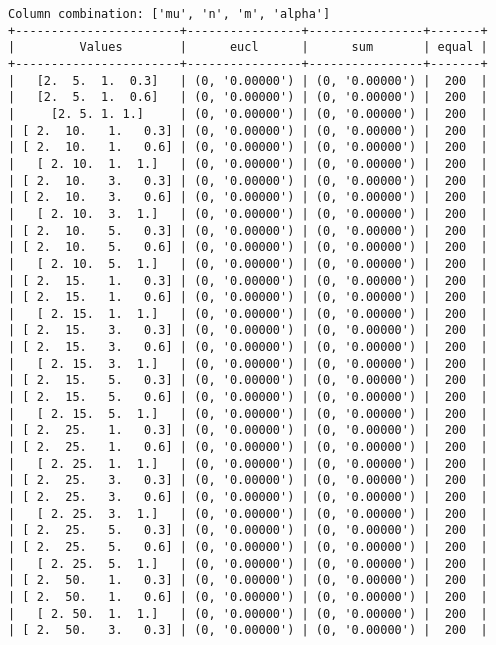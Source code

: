 \documentclass{article}
\begin{document}
\begin{verbatim}
Column combination: ['mu', 'n', 'm', 'alpha']
+-----------------------+----------------+----------------+-------+
|         Values        |      eucl      |      sum       | equal |
+-----------------------+----------------+----------------+-------+
|   [2.  5.  1.  0.3]   | (0, '0.00000') | (0, '0.00000') |  200  |
|   [2.  5.  1.  0.6]   | (0, '0.00000') | (0, '0.00000') |  200  |
|     [2. 5. 1. 1.]     | (0, '0.00000') | (0, '0.00000') |  200  |
| [ 2.  10.   1.   0.3] | (0, '0.00000') | (0, '0.00000') |  200  |
| [ 2.  10.   1.   0.6] | (0, '0.00000') | (0, '0.00000') |  200  |
|   [ 2. 10.  1.  1.]   | (0, '0.00000') | (0, '0.00000') |  200  |
| [ 2.  10.   3.   0.3] | (0, '0.00000') | (0, '0.00000') |  200  |
| [ 2.  10.   3.   0.6] | (0, '0.00000') | (0, '0.00000') |  200  |
|   [ 2. 10.  3.  1.]   | (0, '0.00000') | (0, '0.00000') |  200  |
| [ 2.  10.   5.   0.3] | (0, '0.00000') | (0, '0.00000') |  200  |
| [ 2.  10.   5.   0.6] | (0, '0.00000') | (0, '0.00000') |  200  |
|   [ 2. 10.  5.  1.]   | (0, '0.00000') | (0, '0.00000') |  200  |
| [ 2.  15.   1.   0.3] | (0, '0.00000') | (0, '0.00000') |  200  |
| [ 2.  15.   1.   0.6] | (0, '0.00000') | (0, '0.00000') |  200  |
|   [ 2. 15.  1.  1.]   | (0, '0.00000') | (0, '0.00000') |  200  |
| [ 2.  15.   3.   0.3] | (0, '0.00000') | (0, '0.00000') |  200  |
| [ 2.  15.   3.   0.6] | (0, '0.00000') | (0, '0.00000') |  200  |
|   [ 2. 15.  3.  1.]   | (0, '0.00000') | (0, '0.00000') |  200  |
| [ 2.  15.   5.   0.3] | (0, '0.00000') | (0, '0.00000') |  200  |
| [ 2.  15.   5.   0.6] | (0, '0.00000') | (0, '0.00000') |  200  |
|   [ 2. 15.  5.  1.]   | (0, '0.00000') | (0, '0.00000') |  200  |
| [ 2.  25.   1.   0.3] | (0, '0.00000') | (0, '0.00000') |  200  |
| [ 2.  25.   1.   0.6] | (0, '0.00000') | (0, '0.00000') |  200  |
|   [ 2. 25.  1.  1.]   | (0, '0.00000') | (0, '0.00000') |  200  |
| [ 2.  25.   3.   0.3] | (0, '0.00000') | (0, '0.00000') |  200  |
| [ 2.  25.   3.   0.6] | (0, '0.00000') | (0, '0.00000') |  200  |
|   [ 2. 25.  3.  1.]   | (0, '0.00000') | (0, '0.00000') |  200  |
| [ 2.  25.   5.   0.3] | (0, '0.00000') | (0, '0.00000') |  200  |
| [ 2.  25.   5.   0.6] | (0, '0.00000') | (0, '0.00000') |  200  |
|   [ 2. 25.  5.  1.]   | (0, '0.00000') | (0, '0.00000') |  200  |
| [ 2.  50.   1.   0.3] | (0, '0.00000') | (0, '0.00000') |  200  |
| [ 2.  50.   1.   0.6] | (0, '0.00000') | (0, '0.00000') |  200  |
|   [ 2. 50.  1.  1.]   | (0, '0.00000') | (0, '0.00000') |  200  |
| [ 2.  50.   3.   0.3] | (0, '0.00000') | (0, '0.00000') |  200  |

\end{verbatim}
\end{document}
